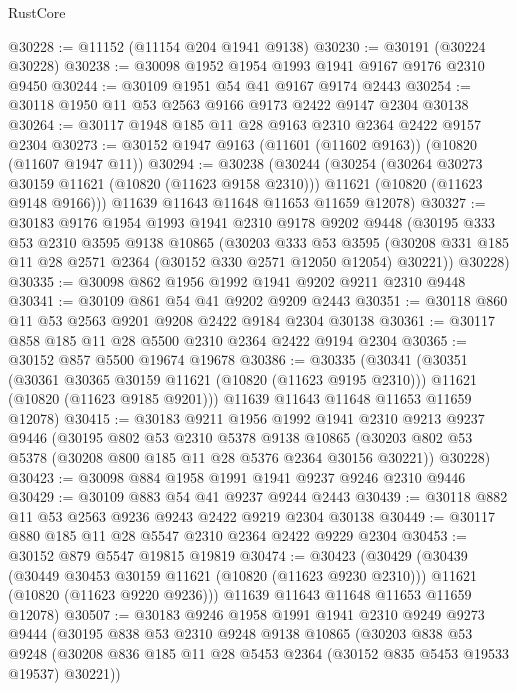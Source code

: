 \begin{lexlean}{RustCore}
\begin{coremodule}
@30228 := @11152 (@11154 @204 @1941 @9138)
@30230 := @30191 (@30224 @30228)
@30238 := @30098 @1952 @1954 @1993 @1941 @9167 @9176 @2310 @9450
@30244 := @30109 @1951 @54 @41 @9167 @9174 @2443
@30254 := @30118 @1950 @11 @53 @2563 @9166 @9173 @2422 @9147 @2304 @30138
@30264 := @30117 @1948 @185 @11 @28 @9163 @2310 @2364 @2422 @9157 @2304
@30273 := @30152 @1947 @9163 (@11601 (@11602 @9163)) (@10820 (@11607 @1947 @11))
@30294 := @30238
    (@30244
      (@30254
        (@30264 @30273 @30159 @11621 (@10820 (@11623 @9158 @2310)))
        @11621
        (@10820 (@11623 @9148 @9166)))
      @11639
      @11643
      @11648
      @11653
      @11659
      @12078)
@30327 := @30183
    @9176
    @1954
    @1993
    @1941
    @2310
    @9178
    @9202
    @9448
    (@30195
      @333
      @53
      @2310
      @3595
      @9138
      @10865
      (@30203
        @333
        @53
        @3595
        (@30208 @331 @185 @11 @28 @2571 @2364 (@30152 @330 @2571 @12050 @12054) @30221))
      @30228)
@30335 := @30098 @862 @1956 @1992 @1941 @9202 @9211 @2310 @9448
@30341 := @30109 @861 @54 @41 @9202 @9209 @2443
@30351 := @30118 @860 @11 @53 @2563 @9201 @9208 @2422 @9184 @2304 @30138
@30361 := @30117 @858 @185 @11 @28 @5500 @2310 @2364 @2422 @9194 @2304
@30365 := @30152 @857 @5500 @19674 @19678
@30386 := @30335
    (@30341
      (@30351
        (@30361 @30365 @30159 @11621 (@10820 (@11623 @9195 @2310)))
        @11621
        (@10820 (@11623 @9185 @9201)))
      @11639
      @11643
      @11648
      @11653
      @11659
      @12078)
@30415 := @30183
    @9211
    @1956
    @1992
    @1941
    @2310
    @9213
    @9237
    @9446
    (@30195
      @802
      @53
      @2310
      @5378
      @9138
      @10865
      (@30203 @802 @53 @5378 (@30208 @800 @185 @11 @28 @5376 @2364 @30156 @30221))
      @30228)
@30423 := @30098 @884 @1958 @1991 @1941 @9237 @9246 @2310 @9446
@30429 := @30109 @883 @54 @41 @9237 @9244 @2443
@30439 := @30118 @882 @11 @53 @2563 @9236 @9243 @2422 @9219 @2304 @30138
@30449 := @30117 @880 @185 @11 @28 @5547 @2310 @2364 @2422 @9229 @2304
@30453 := @30152 @879 @5547 @19815 @19819
@30474 := @30423
    (@30429
      (@30439
        (@30449 @30453 @30159 @11621 (@10820 (@11623 @9230 @2310)))
        @11621
        (@10820 (@11623 @9220 @9236)))
      @11639
      @11643
      @11648
      @11653
      @11659
      @12078)
@30507 := @30183
    @9246
    @1958
    @1991
    @1941
    @2310
    @9249
    @9273
    @9444
    (@30195
      @838
      @53
      @2310
      @9248
      @9138
      @10865
      (@30203
        @838
        @53
        @9248
        (@30208 @836 @185 @11 @28 @5453 @2364 (@30152 @835 @5453 @19533 @19537) @30221))

\end{coremodule}
\end{lexlean}
